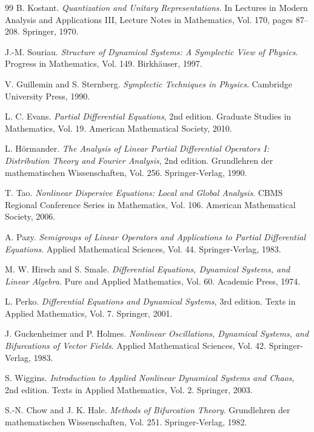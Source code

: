 \documentclass[11pt]{article}
\theoremstyle{definition}
\begin{document}
\begin{thebibliography}{99}
B. Kostant.
\textit{Quantization and Unitary Representations}.
In Lectures in Modern Analysis and Applications III, Lecture Notes in Mathematics, Vol. 170, pages 87--208. Springer, 1970.

J.-M. Souriau.
\textit{Structure of Dynamical Systems: A Symplectic View of Physics}.
Progress in Mathematics, Vol. 149. Birkhäuser, 1997.

V. Guillemin and S. Sternberg.
\textit{Symplectic Techniques in Physics}.
Cambridge University Press, 1990.

L. C. Evans.
\textit{Partial Differential Equations}, 2nd edition.
Graduate Studies in Mathematics, Vol. 19. American Mathematical Society, 2010.

L. Hörmander.
\textit{The Analysis of Linear Partial Differential Operators I: Distribution Theory and Fourier Analysis}, 2nd edition.
Grundlehren der mathematischen Wissenschaften, Vol. 256. Springer-Verlag, 1990.

T. Tao.
\textit{Nonlinear Dispersive Equations: Local and Global Analysis}.
CBMS Regional Conference Series in Mathematics, Vol. 106. American Mathematical Society, 2006.

A. Pazy.
\textit{Semigroups of Linear Operators and Applications to Partial Differential Equations}.
Applied Mathematical Sciences, Vol. 44. Springer-Verlag, 1983.

M. W. Hirsch and S. Smale.
\textit{Differential Equations, Dynamical Systems, and Linear Algebra}.
Pure and Applied Mathematics, Vol. 60. Academic Press, 1974.

L. Perko.
\textit{Differential Equations and Dynamical Systems}, 3rd edition.
Texts in Applied Mathematics, Vol. 7. Springer, 2001.

J. Guckenheimer and P. Holmes.
\textit{Nonlinear Oscillations, Dynamical Systems, and Bifurcations of Vector Fields}.
Applied Mathematical Sciences, Vol. 42. Springer-Verlag, 1983.

S. Wiggins.
\textit{Introduction to Applied Nonlinear Dynamical Systems and Chaos}, 2nd edition.
Texts in Applied Mathematics, Vol. 2. Springer, 2003.

S.-N. Chow and J. K. Hale.
\textit{Methods of Bifurcation Theory}.
Grundlehren der mathematischen Wissenschaften, Vol. 251. Springer-Verlag, 1982.


\end{thebibliography}
\end{document}
